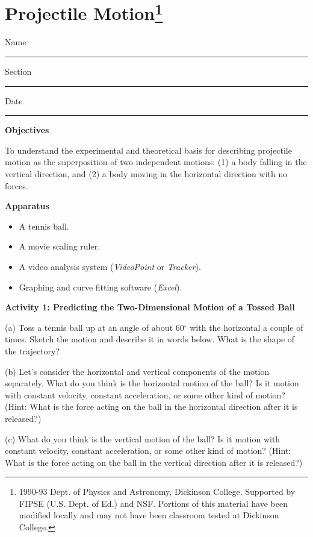 
\section{Projectile Motion\footnote{
1990-93 Dept. of Physics and Astronomy, Dickinson College. Supported by FIPSE
(U.S. Dept. of Ed.) and NSF. Portions of this material have been modified locally
and may not have been classroom tested at Dickinson College.
}}

Name \rule{2.0in}{0.1pt}\hfill{}Section \rule{1.0in}{0.1pt}\hfill{}Date \rule{1.0in}{0.1pt}

\textbf{Objectives }

To understand the experimental and theoretical basis for describing projectile
motion as the superposition of two independent motions: (1) a body falling in
the vertical direction, and (2) a body moving in the horizontal direction with
no forces.

\textbf{Apparatus}

\begin{itemize}
\item A tennis ball. 
\item A movie scaling ruler.
\item A video analysis system (\textit{VideoPoint} or \textit{Tracker}). 
\item Graphing and curve fitting software (\textit{Excel}).
\end{itemize}
\textbf{Activity 1: Predicting the Two-Dimensional Motion of a Tossed Ball }

(a) Toss a tennis ball up at an angle of about 60\( ^{\circ } \) with the horizontal
a couple of times. Sketch the motion and describe it in words below. What is
the shape of the trajectory?
\vspace{20mm}

(b) Let's consider the horizontal and vertical components of the motion separately.
What do you think is the horizontal motion of the ball? Is it motion with constant
velocity, constant acceleration, or some other kind of motion? (Hint: What
is the force acting on the ball in the horizontal direction after it is released?)
\vspace{20mm}

(c) What do you think is the vertical motion of the ball? Is it motion with
constant velocity, constant acceleration, or some other kind of motion?
(Hint: What is the force acting on the ball in the vertical direction after
it is released?)
\vspace{20mm}

